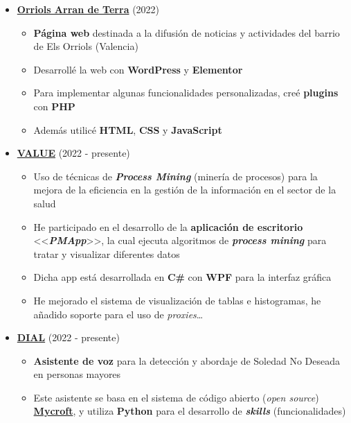 \documentclass[letterpaper, 12pt, dvipsnames]{article}
\begin{document}
\vspace{1em}

\begin{itemize}
    \item {\large\textbf{\href{https://orriolsarrandeterra.com/}{Orriols Arran de Terra}}} (2022)
          \begin{itemize}
              \item \textbf{Página web} destinada a la difusión de noticias y actividades del barrio de Els Orriols (Valencia)
              \item Desarrollé la web con \textbf{WordPress} y \textbf{Elementor}
              \item Para implementar algunas funcionalidades personalizadas, creé \textbf{plugins} con \textbf{PHP}
              \item Además utilicé \textbf{HTML}, \textbf{CSS} y \textbf{JavaScript}
          \end{itemize}
    \item {\large\textbf{\href{https://www.sabien.upv.es/project/value/}{VALUE}}} (2022 - presente)
          \begin{itemize}
              \item Uso de técnicas de \textbf{\emph{Process Mining}} (minería de procesos) para la mejora de la eficiencia en la gestión de la información en el sector de la salud
              \item He participado en el desarrollo de la \textbf{aplicación de escritorio} <<\textbf{\emph{PMApp}}>>, la cual ejecuta algoritmos de \textbf{\emph{process mining}} para tratar y visualizar diferentes datos
              \item Dicha app está desarrollada en \textbf{C\#} con \textbf{WPF} para la interfaz gráfica
              \item He mejorado el sistema de visualización de tablas e histogramas, he añadido soporte para el uso de \emph{proxies}\dots
          \end{itemize}
    \item {\large\textbf{\href{http://www.sabien.upv.es/project/dial/}{DIAL}}} (2022 - presente)
          \begin{itemize}
              \item \textbf{Asistente de voz} para la detección y abordaje de Soledad No Deseada en personas mayores
              \item Este asistente se basa en el sistema de código abierto (\emph{open source}) \textbf{\href{https://mycroft.ai/}{Mycroft}}, y utiliza \textbf{Python} para el desarrollo de \textbf{\emph{skills}} (funcionalidades)

\end{itemize}
\end{itemize}
\end{document}
